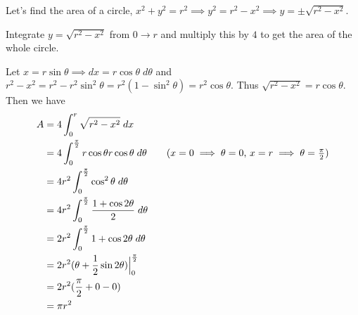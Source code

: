 \documentclass{article}
\begin{document}
\begin{example}
  Let's find the area of a circle, $x^2 + y^2 = r^2 \implies y^2 = r^2 - x^2 \implies y = \pm \sqrt{r^2 - x^2}$.

  Integrate $y = \sqrt{r^2 - x^2}$ from $0 \to r$ and multiply this by $4$ to get the area of the whole circle.

  Let $x = r\sin\theta \implies dx = r\cos\theta \; d\theta$ and $r^2 - x^2 = r^2 - r^2\sin^2\theta = r^2(1-\sin^2\theta) = r^2\cos\theta$. Thus $\sqrt{r^2 - x^2} = r\cos\theta$.
  Then we have
  \begin{align*}
    A &= 4\int_0^r \sqrt{r^2 - x^2} \; dx\\
    &= 4\int_0^{\frac{\pi}{2}}r\cos\theta r\cos\theta \; d\theta \tag{$x = 0 \implies \theta = 0$, $x = r \implies \theta = \frac{\pi}{2}$}\\
    &= 4r^2\int_0^{\frac{\pi}{2}} \cos^2\theta \; d\theta\\
    &= 4r^2\int_0^{\frac{\pi}{2}} \frac{1 + \cos 2\theta}{2} \; d\theta\\
    &= 2r^2 \int_0^{\frac{\pi}{2}} 1 + \cos2\theta \; d\theta\\
    &= 2r^2 (\theta + \frac{1}{2}\sin 2\theta)\Big|_0^{\frac{\pi}{2}}\\
    &= 2r^2 (\frac{\pi}{2} + 0 - 0)\\
    &= \pi r^2
  \end{align*}
\end{example}
\end{document}
